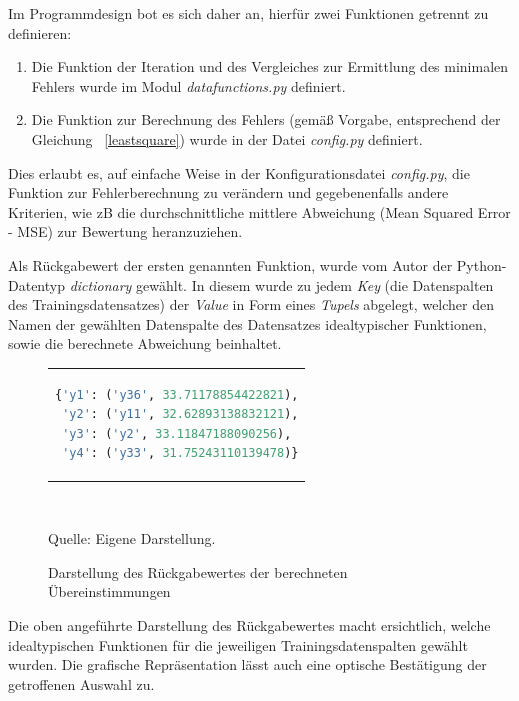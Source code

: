 Im Programmdesign bot es sich daher an, hierfür zwei Funktionen getrennt zu definieren:
\begin{enumerate}
 \itemsep0pt
 \item Die Funktion der Iteration und des Vergleiches zur Ermittlung des minimalen Fehlers wurde im Modul \emph{datafunctions.py} definiert.
 \item Die Funktion zur Berechnung des Fehlers (gemäß Vorgabe, entsprechend der Gleichung ~\ref{leastsquare}) wurde in der Datei \emph{config.py} definiert.
\end{enumerate}

Dies erlaubt es, auf einfache Weise in der Konfigurationsdatei \emph{config.py}, die Funktion zur Fehlerberechnung zu verändern und gegebenenfalls andere Kriterien, wie zB die durchschnittliche mittlere Abweichung (Mean Squared Error - MSE) zur Bewertung heranzuziehen. 

Als Rückgabewert der ersten genannten Funktion, wurde vom Autor der Python-Datentyp \emph{dictionary} gewählt. In diesem wurde zu jedem \emph{Key} (die Datenspalten des Trainingsdatensatzes) der \emph{Value} in Form eines \emph{Tupels} abgelegt, welcher den Namen der gewählten Datenspalte des Datensatzes idealtypischer Funktionen, sowie die berechnete Abweichung beinhaltet.

\begin{figure}[h]
\caption{Darstellung des Rückgabewertes der berechneten Übereinstimmungen}
\begin{tabular}{l}
\begin{lstlisting}[language=python,label=dictresult]
{'y1': ('y36', 33.71178854422821),
 'y2': ('y11', 32.62893138832121),
 'y3': ('y2', 33.11847188090256),
 'y4': ('y33', 31.75243110139478)}
\end{lstlisting}
\end{tabular}\\
\begin{center}
Quelle: Eigene Darstellung.
\end{center}
\label{fig:resultdict}
\end{figure}

Die oben angeführte Darstellung des Rückgabewertes macht ersichtlich, welche idealtypischen Funktionen für die jeweiligen Trainingsdatenspalten gewählt wurden. Die grafische Repräsentation lässt auch eine optische Bestätigung der getroffenen Auswahl zu.

